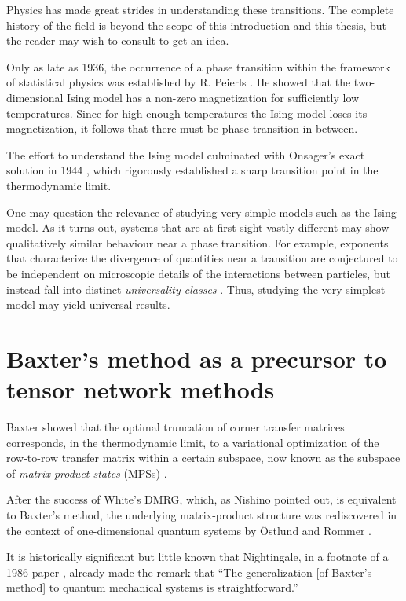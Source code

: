 Physics has made great strides in understanding these transitions. The
complete history of the field is beyond the scope of this introduction and this
thesis, but the reader may wish to consult \cite{kadanoff2009more,
domb1996critical} to get an idea.

Only as late as 1936, the occurrence of a phase transition
within the framework of statistical physics was established by R. Peierls
\cite{peierls1936on_ising}. He showed that the two-dimensional Ising model
has a non-zero magnetization for sufficiently low temperatures. Since for
high enough temperatures the Ising model loses its magnetization, it
follows that there must be phase transition in between.

The effort to understand the Ising model culminated with Onsager's exact
solution in 1944 \cite{onsager1944two_dimensional}, which rigorously
established a sharp transition point in the thermodynamic limit.

One may question the relevance of studying very simple models such as the
Ising model. As it turns out, systems that are at first sight vastly
different may show qualitatively similar behaviour near a phase
transition. For example, exponents that characterize the divergence of
quantities near a transition are conjectured to be independent on
microscopic details of the interactions between particles, but instead
fall into distinct \emph{universality classes}
\cite{griffiths1970dependence, fisher1966quantum}. Thus, studying the very
simplest model may yield universal results.

\section{Baxter's method as a precursor to tensor network methods}

Baxter showed that the optimal truncation of corner transfer matrices
corresponds, in the thermodynamic limit, to a variational optimization of
the row-to-row transfer matrix within a certain subspace, now known as the
subspace of \emph{matrix product states} (MPSs) \cite{baxter1968dimers,
baxter1982exactly_ctm}.

After the success of White's DMRG, which, as Nishino pointed out, is equivalent
to Baxter's method, the underlying matrix-product structure was rediscovered in
the context of one-dimensional quantum systems by Östlund and Rommer
\cite{ostlund1995thermodynamic, rommer1997class}.

It is historically significant but little known that Nightingale, in
a footnote of a 1986 paper \cite{nightingale1986gap}, already made the
remark that \enquote{The generalization [of Baxter's method] to quantum
mechanical systems is straightforward.}

